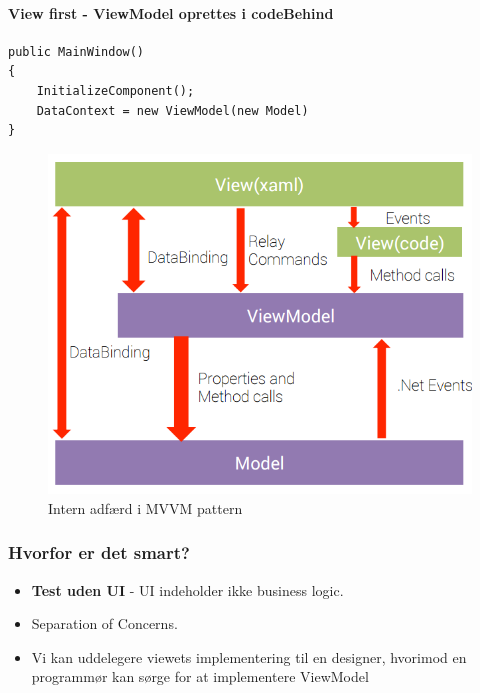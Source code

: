 \paragraph{View first - ViewModel oprettes i codeBehind}

\begin{lstlisting}[caption=ViewModel oprettes i views codeBehind]
public MainWindow()
{
	InitializeComponent();
	DataContext = new ViewModel(new Model)
}
\end{lstlisting}

\begin{figure}[H]
\centering
\includegraphics[width=0.7\linewidth]{figs/MVVM/mvvmPatternComplex}
\caption{Intern adfærd i MVVM pattern}
\label{fig:mvvmPatternComplex}
\end{figure}

\subsubsection{Hvorfor er det smart?}

\begin{itemize}
	\item \textbf{Test uden UI} - UI indeholder ikke business logic.
	\item Separation of Concerns.
	\item Vi kan uddelegere viewets implementering til en designer, hvorimod en programmør kan sørge for at implementere ViewModel
\end{itemize}




